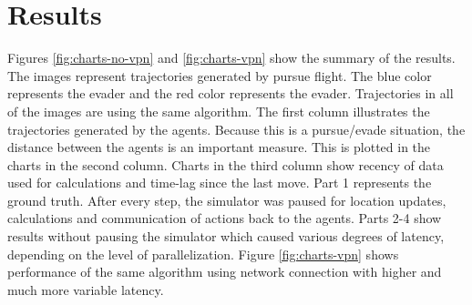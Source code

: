 \documentclass{article}
\begin{document}

\section{Results}
Figures \ref{fig:charts-no-vpn} and \ref{fig:charts-vpn} show the summary of the results.  The images represent trajectories generated by pursue flight. The blue color represents the evader and the red color represents the evader. Trajectories in all of the images are using the same algorithm. The first column illustrates the trajectories generated by the agents. Because this is a pursue/evade situation, the distance between the agents is an important measure. This is plotted in the charts in the second column.
Charts in the third column show recency of data used for calculations and time-lag since the last move. Part 1 represents the ground truth. After every step, the simulator was paused for location updates, calculations and communication of actions back to the agents. Parts 2-4 show results without pausing the simulator which caused various degrees of latency, depending on the level of parallelization. Figure \ref{fig:charts-vpn} shows performance of the same algorithm using network connection with higher and much more variable latency.
\end{document}
